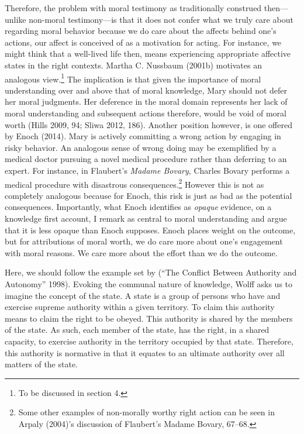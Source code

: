 \documentclass[
  letterpaper,
  DIV=11,
  numbers=noendperiod]{scrartcl}
\theoremstyle{remark}
\begin{document}
Therefore, the problem with moral testimony as traditionally construed
then---unlike non-moral testimony---is that it does not confer what we
truly care about regarding moral behavior because we do care about the
affects behind one's actions, our affect is conceived of as a motivation
for acting. For instance, we might think that a well-lived life then,
means experiencing appropriate affective states in the right contexts.
Martha C. Nussbaum (2001b) motivates an analogous view.\footnote{To be
  discussed in section 4.} The implication is that given the importance
of moral understanding over and above that of moral knowledge, Mary
should not defer her moral judgments. Her deference in the moral domain
represents her lack of moral understanding and subsequent actions
therefore, would be void of moral worth (Hills 2009, 94; Sliwa 2012,
186). Another position however, is one offered by Enoch (2014). Mary is
actively committing a wrong action by engaging in risky behavior. An
analogous sense of wrong doing may be exemplified by a medical doctor
pursuing a novel medical procedure rather than deferring to an expert.
For instance, in Flaubert's \emph{Madame Bovary}, Charles Bovary
performs a medical procedure with disastrous consequences.\footnote{Some
  other examples of non-morally worthy right action can be seen in
  Arpaly (2004)'s discussion of Flaubert's Madame Bovary, 67--68.}
However this is not as completely analogous because for Enoch, this risk
is just as bad as the potential consequences. Importantly, what Enoch
identifies as \emph{opaque} evidence, on a knowledge first account, I
remark as central to moral understanding and argue that it is less
opaque than Enoch supposes. Enoch places weight on the outcome, but for
attributions of moral worth, we do care more about one's engagement with
moral reasons. We care more about the effort than we do the outcome.

Here, we should follow the example set by (``The Conflict Between
Authority and Autonomy'' 1998). Evoking the communal nature of
knowledge, Wolff asks us to imagine the concept of the state. A state is
a group of persons who have and exercise supreme authority within a
given territory. To claim this authority means to claim the right to be
obeyed. This authority is shared by the members of the state. As such,
each member of the state, has the right, in a shared capacity, to
exercise authority in the territory occupied by that state. Therefore,
this authority is normative in that it equates to an ultimate authority
over all matters of the state.
\end{document}
